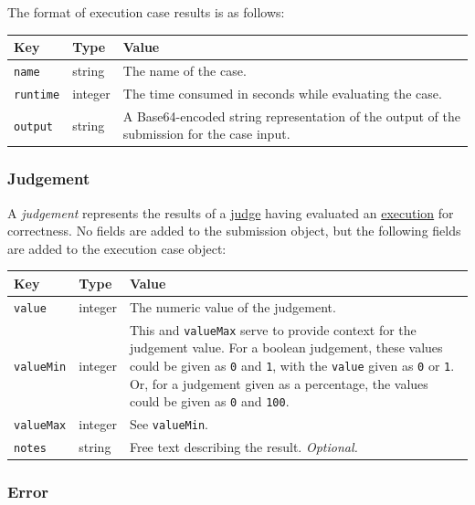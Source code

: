 \documentclass[11pt,letterpaper]{article}
\begin{document}
The format of execution case results is as follows:

\nopagebreak
\begin{tabulary}{\textwidth}{ | l | l | L | }
    \hline
    \textbf{Key} & \textbf{Type} & \textbf{Value} \\
    \hline
    \texttt{name} & string & The name of the case. \\
    \hline
    \texttt{runtime} & integer & The time consumed in seconds while evaluating
        the case. \\
    \hline
    \texttt{output} & string & A Base64-encoded string representation of the
        output of the submission for the case input. \\
    \hline
\end{tabulary}

\subsubsection{Judgement}
\label{comm-formats-judge}

A \emph{judgement} represents the results of a
\hyperref[design-executor-judge]{judge} having evaluated an
\hyperref[comm-formats-exec]{execution} for correctness. No fields are added to
the submission object, but the following fields are added to the execution case
object:

\nopagebreak
\begin{tabulary}{\textwidth}{ | l | l | L | }
    \hline
    \textbf{Key} & \textbf{Type} & \textbf{Value} \\
    \hline
    \texttt{value} & integer & The numeric value of the judgement. \\
    \hline
    \texttt{valueMin} & integer & This and \texttt{valueMax} serve to provide
        context for the judgement value. For a boolean judgement, these values
        could be given as \texttt{0} and \texttt{1}, with the \texttt{value}
        given as \texttt{0} or \texttt{1}. Or, for a judgement given as a
        percentage, the values could be given as \texttt{0} and \texttt{100}.
        \\
    \hline
    \texttt{valueMax} & integer & See \texttt{valueMin}. \\
    \hline
    \texttt{notes} & string & Free text describing the result.
        \emph{Optional.} \\
    \hline
\end{tabulary}

\subsubsection{Error}
\label{comm-formats-error}
\end{document}
